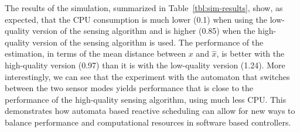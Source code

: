 \documentclass{sig-alternate-ipsn13}
\begin{document}
The results of the simulation, summarized in Table~\ref{tbl:sim-results}, show, as expected, that the CPU consumption is much lower (0.1) when using the low-quality version of the sensing algorithm and is higher (0.85) when the high-quality version of the sensing algorithm is used. The performance of the estimation, in terms of the mean distance between $x$ and $\hat x$, is better with the high-quality version (0.97) than it is with the low-quality version (1.24). More interestingly, we can see that the experiment with the automaton that switches between the two sensor modes yields performance that is close to the performance of the high-quality sensing algorithm, using much less CPU. This demonstrates how automata based reactive scheduling can allow for new ways to balance performance and computational resources in software based controllers. 








%    
%    
%    
%
%
\end{document}
